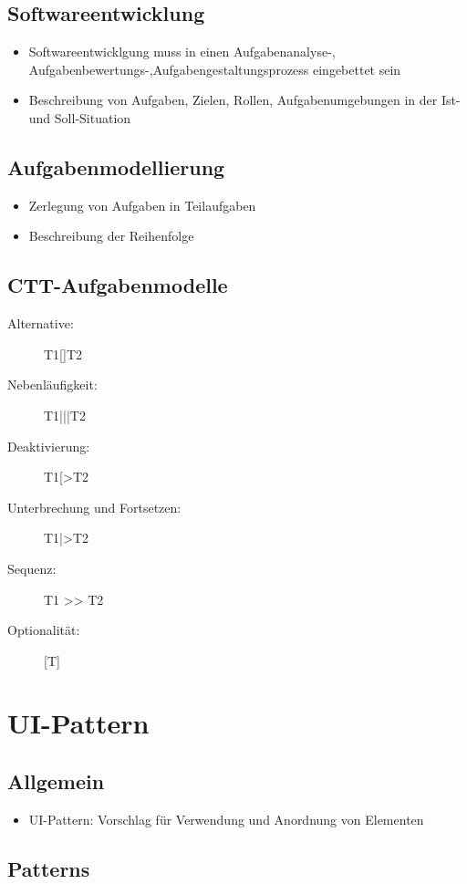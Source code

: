\documentclass[11pt, fleqn, a4paper, leqno]{scrartcl} %
\begin{document}
		\subsection{Softwareentwicklung}
			\begin{itemize}
				\item Softwareentwicklgung muss in einen Aufgabenanalyse-, Aufgabenbewertungs-,Aufgabengestaltungsprozess eingebettet sein
				\item Beschreibung von Aufgaben, Zielen, Rollen, Aufgabenumgebungen in der Ist- und Soll-Situation
			\end{itemize}
		\subsection{Aufgabenmodellierung}
			\begin{itemize}
				\item Zerlegung von Aufgaben in Teilaufgaben
				\item Beschreibung der Reihenfolge
			\end{itemize}
		\subsection{CTT-Aufgabenmodelle}
			\begin{description}
				\item[Alternative:] T1[]T2
				\item[Nebenläufigkeit:]T1|||T2
				\item[Deaktivierung:]T1[>T2
				\item[Unterbrechung und Fortsetzen:] T1|>T2
				\item[Sequenz:] T1 >> T2
				\item[Optionalität:] [T]
			\end{description}
	\section{UI-Pattern}
		\subsection{Allgemein}
			\begin{itemize}
				\item UI-Pattern: Vorschlag für Verwendung und Anordnung von Elementen
			\end{itemize}
		\subsection{Patterns}
\end{document}
